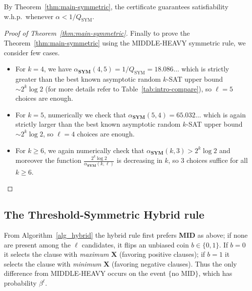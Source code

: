 \documentclass[11pt,reqno]{amsart}
\numberwithin{equation}{section}
\renewcommand{\vec}[1]{\boldsymbol{#1}}
\newcommand\vX{\vec X}
\newcommand\Thm{Theorem}
\begin{document}
	By Theorem~\ref{thm:main-symmetric}, the certificate guarantees satisfiability w.h.p.\ whenever
	\(\alpha<1/Q_{\mathrm{SYM}}\).
	\begin{proof}[Proof of \Thm~\ref{thm:main-symmetric}]
		Finally to prove the \Thm~\ref{thm:main-symmetric} using the MIDDLE-HEAVY symmetric rule, we consider few cases.
		\begin{itemize}
			\item For $k=4$, we have $\alpha_{\mathbf{SYM}}(4,5)=1/Q_{\mathrm{SYM}}=18.086\dots$ which is strictly greater than the best known asymptotic random $k$-SAT upper bound $\sim 2^k\log 2$ (for more details refer to Table~\ref{tab:intro-compare}), so $\ell=5$ choices are enough.
			\item 	For $k=5$, numerically we check that $\alpha_{\textbf{SYM}}(5,4)=65.032\dots$ which is again strictly larger than the best known asymptotic random $k$-SAT upper bound $\sim 2^k\log 2$, so $\ell=4$ choices are enough.
			\item For $k\geq 6$, we again numerically check that $\alpha_{\mathbf{SYM}}(k,3)>2^k\log 2$ and moreover the function $\frac{2^k\log 2}{\alpha_{\mathbf{SYM}}(k,\ell)}$ is decreasing in $k$, so $3$ choices suffice for all $k\geq 6$.
		\end{itemize}
	\end{proof}
	\subsection{The Threshold-Symmetric Hybrid rule}
	From Algorithm~\ref{alg_hybrid} the hybrid rule first prefers \textbf{MID} as above; if none are present among the \(\ell\) candidates, it flips an unbiased coin \(b\in\{0,1\}\). If \(b=0\) it selects the clause with \emph{maximum} \(\vX\) (favoring positive clauses); if \(b=1\) it selects the clause with \emph{minimum} \(\vX\) (favoring negative clauses). Thus the only difference from MIDDLE-HEAVY occurs on the event \(\{\text{no MID}\}\), which has probability \(\beta^\ell\).
	
\end{document}
